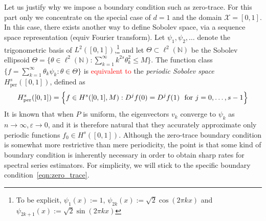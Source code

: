 \documentclass{article}
\newcommand{\1}{\mathbf{1}}
\newcommand{\Leb}{L}
\newcommand{\mc}[1]{\mathcal{#1}}
\theoremstyle{alden}
\theoremstyle{aldenthm}
\theoremstyle{definition}
\theoremstyle{remark}
\begin{document}
Let us justify why we impose a boundary condition such as zero-trace. For this part only we concentrate on the special case of $d = 1$ and the domain $\mc{X} = [0,1]$. In this case, there exists another way to define Sobolev space, via a sequence space representation (equiv Fourier transform). Let $\psi_1,\psi_2,\ldots$ denote the trigonometric basis of $\Leb^2([0,1])$,\footnote{To be explicit, $\psi_1(x) := 1$, $\psi_{2k}(x) := \sqrt{2} \cos(2\pi k x)$ and $\psi_{2k + 1}(x) := \sqrt{2} \sin(2\pi k x)$} and let $\Theta \subset \ell^2(\mathbb{N})$ be the Sobolev ellipsoid $\Theta = \{\theta \in \ell^2(\mathbb{N}): \sum_{k = 1}^{\infty} k^{2s} \theta_k^2 \leq M\}$. The function class $\{f = \sum_{k = 1}^{\infty} \theta_k \psi_k: \theta \in \Theta\}$ is \textcolor{red}{equivalent to} the \emph{periodic Sobolev space} $H_{\mathrm{per}}^s([0,1])$, defined as
\begin{equation}
\label{eqn:periodic_sobolev_space}
H_{\mathrm{per}}^s([0,1]) = \Bigl\{f \in H^s([0,1],M): D^jf(0) = D^jf(1)~~\textrm{for $j = 0,\ldots, s - 1$} \Bigr\}
\end{equation}
It is known that when $P$ is uniform, the eigenvectors $v_k$ converge to $\psi_k$ as $n \to \infty, \varepsilon \to 0$, and it is therefore natural that they accurately approximate only periodic functions $f_0 \in H^s([0,1])$. Although the zero-trace boundary condition is somewhat more restrictive than mere periodicity, the point is that some kind of boundary condition is inherently necessary in order to obtain sharp rates for spectral series estimators. For simplicity, we will stick to the specific boundary condition~\eqref{eqn:zero_trace}. 
\end{document}
